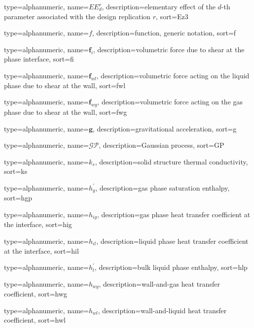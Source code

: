 {
  type=alphanumeric,
	name={\ensuremath{ EE_d^r}},
	description={elementary effect of the $d$-th parameter associated with the design replication $r$},
	sort={Ez3}
}

{
  type=alphanumeric,
	name={\ensuremath{f}},
	description={function, generic notation},
	sort={f}
}

{
  type=alphanumeric,
	name={\ensuremath{\mathbf{f}_i}},
	description={volumetric force due to shear at the phase interface},
	sort={fi}
}

{
  type=alphanumeric,
	name={\ensuremath{\mathbf{f}_{wl}}},
	description={volumetric force acting on the liquid phase due to shear at the wall},
	sort={fwl}
}

{
  type=alphanumeric,
	name={\ensuremath{\mathbf{f}_{wg}}},
	description={volumetric force acting on the gas phase due to shear at the wall},
	sort={fwg}
}

{
  type=alphanumeric,
	name={\ensuremath{\mathbf{g}}},
	description={gravitational acceleration},
	sort={g}
}

{
  type=alphanumeric,
	name={\ensuremath{\mathcal{GP}}},
	description={Gaussian process},
	sort={GP}
}

{
  type=alphanumeric,
	name={\ensuremath{k_s}},
	description={solid structure thermal conductivity},
	sort={ks}
}

{
  type=alphanumeric,
	name={\ensuremath{h^\prime_g}},
	description={gas phase saturation enthalpy},
	sort={hgp}
}

{
  type=alphanumeric,
	name={\ensuremath{h_{ig}}},
	description={gas phase heat transfer coefficient at the interface},
	sort={hig}
}

{
  type=alphanumeric,
	name={\ensuremath{h_{il}}},
	description={liquid phase heat transfer coefficient at the interface},
	sort={hil}
}

{
  type=alphanumeric,
	name={\ensuremath{h^\prime_l}},
	description={bulk liquid phase enthalpy},
	sort={hlp}
}

{
  type=alphanumeric,
	name={\ensuremath{h_{wg}}},
	description={wall-and-gas heat transfer coefficient},
	sort={hwg}
}

{
  type=alphanumeric,
	name={\ensuremath{h_{wl}}},
	description={wall-and-liquid heat transfer coefficient},
	sort={hwl}
}


